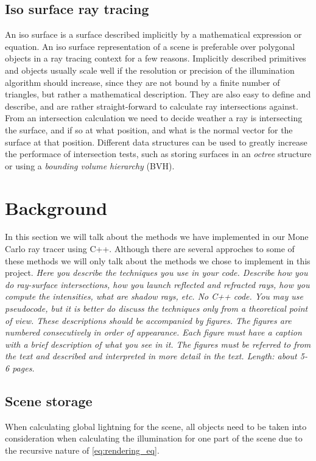 \documentclass[]{report}   %
\begin{document}
\section{Iso surface ray tracing}
An iso surface is a surface described implicitly by a mathematical expression or equation. An iso surface representation of a scene is preferable over polygonal objects in a ray tracing context for a few reasons. Implicitly described primitives and objects usually scale well if the resolution or precision of the illumination algorithm should increase, since they are not bound by a finite number of triangles, but rather a mathematical description. They are also easy to define and describe, and are rather straight-forward to calculate ray intersections against. From an intersection calculation we need to decide weather a ray is intersecting the surface, and if so at what position, and what is the normal vector for the surface at that position. Different data structures can be used to greatly increase the performace of intersection tests, such as storing surfaces in an \emph{octree} structure or using a \emph{bounding volume hierarchy} (BVH).


\chapter{Background}
In this section we will talk about the methods we have implemented in our Mone Carlo ray tracer using C++. Although there are several approches to some of these methods we will only talk about the methods we chose to implement in this project.
\emph{Here you describe the techniques you use in your code. 
Describe how you do ray-surface intersections, how you launch reflected and refracted rays, how you compute the intensities, what are shadow rays, etc. No C++ code. 
You may use pseudocode, but it is better do discuss the techniques only from a theoretical point of view. 
These descriptions should be accompanied by figures. 
The figures are numbered consecutively in order of appearance. 
Each figure must have a caption with a brief description of what you see in it. 
The figures must be referred to from the text and described and interpreted in more detail in the text.
Length: about 5-6 pages.}

\section{Scene storage}
When calculating global lightning for the scene, all objects need to be taken into consideration when calculating the illumination for one part of the scene due to the recursive nature of \autoref{eq:rendering_eq}.
\end{document}
